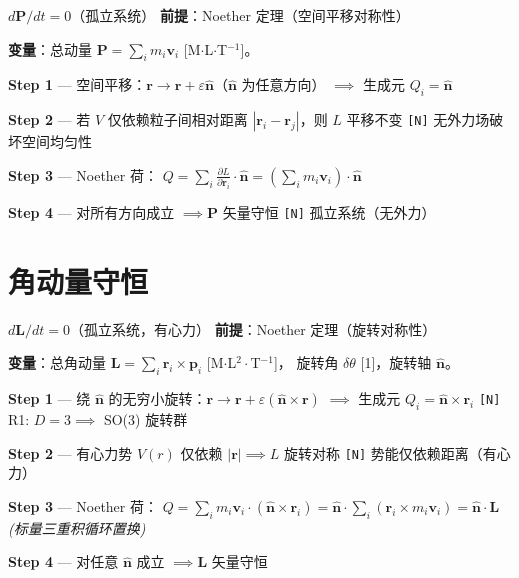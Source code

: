 \begin{lawbox}[动量守恒]
  $d\mathbf{P}/dt = 0$（孤立系统）
  \quad\textbf{前提}：Noether 定理（空间平移对称性）
\end{lawbox}

\noindent\textbf{变量}：总动量 $\mathbf{P} = \sum_i m_i\mathbf{v}_i$ [M$\cdot$L$\cdot$T$^{-1}$]。

\begin{derivationbox}[推导：空间平移对称性到动量守恒]
  \textbf{Step 1} — 空间平移：$\mathbf{r} \to \mathbf{r} + \varepsilon\hat{\mathbf{n}}$（$\hat{\mathbf{n}}$ 为任意方向）
  $\implies$ 生成元 $Q_i = \hat{\mathbf{n}}$

  \textbf{Step 2} — 若 $V$ 仅依赖粒子间相对距离 $|\mathbf{r}_i - \mathbf{r}_j|$，则 $L$ 平移不变
  \hfill\texttt{[N]} 无外力场破坏空间均匀性

  \textbf{Step 3} — Noether 荷：
  $Q = \sum_i \frac{\partial L}{\partial\dot{\mathbf{r}}_i}\cdot\hat{\mathbf{n}} = (\sum_i m_i\mathbf{v}_i)\cdot\hat{\mathbf{n}}$

  \textbf{Step 4} — 对所有方向成立 $\implies \mathbf{P}$ 矢量守恒
  \hfill\texttt{[N]} 孤立系统（无外力）
\end{derivationbox}

\section{角动量守恒}

\begin{lawbox}[角动量守恒]
  $d\mathbf{L}/dt = 0$（孤立系统，有心力）
  \quad\textbf{前提}：Noether 定理（旋转对称性）
\end{lawbox}

\noindent\textbf{变量}：总角动量 $\mathbf{L} = \sum_i \mathbf{r}_i \times \mathbf{p}_i$ [M$\cdot$L$^2\cdot$T$^{-1}$]，
旋转角 $\delta\theta$ [1]，旋转轴 $\hat{\mathbf{n}}$。

\begin{derivationbox}[推导：旋转对称性到角动量守恒]
  \textbf{Step 1} — 绕 $\hat{\mathbf{n}}$ 的无穷小旋转：$\mathbf{r} \to \mathbf{r} + \varepsilon(\hat{\mathbf{n}}\times\mathbf{r})$
  $\implies$ 生成元 $Q_i = \hat{\mathbf{n}} \times \mathbf{r}_i$
  \hfill\texttt{[N]} R1: $D=3 \implies$ SO(3) 旋转群

  \textbf{Step 2} — 有心力势 $V(r)$ 仅依赖 $|\mathbf{r}| \implies L$ 旋转对称
  \hfill\texttt{[N]} 势能仅依赖距离（有心力）

  \textbf{Step 3} — Noether 荷：
  $Q = \sum_i m_i\mathbf{v}_i\cdot(\hat{\mathbf{n}}\times\mathbf{r}_i) = \hat{\mathbf{n}}\cdot\sum_i(\mathbf{r}_i\times m_i\mathbf{v}_i) = \hat{\mathbf{n}}\cdot\mathbf{L}$
  \hfill\textit{(标量三重积循环置换)}

  \textbf{Step 4} — 对任意 $\hat{\mathbf{n}}$ 成立 $\implies \mathbf{L}$ 矢量守恒
\end{derivationbox}

